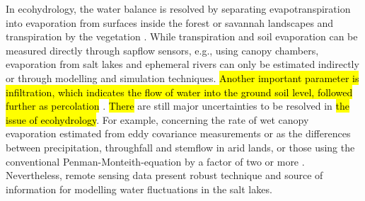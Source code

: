 \documentclass[climate,article,submit,pdftex,moreauthors]{Definitions/mdpi}
\begin{document}
{In ecohydrology, the water balance is resolved by separating evapotranspiration into evaporation from surfaces inside the forest or savannah landscapes and transpiration by the vegetation} \cite{MORGAN2020104220,ZADOROVA2025108671}. While transpiration and soil evaporation can be measured directly through sapflow sensors, e.g., using canopy chambers, evaporation from salt lakes and ephemeral rivers can only be estimated indirectly or through modelling and simulation techniques. \hl{Another important parameter is infiltration, which indicates the flow of water into the ground soil level, followed further as percolation} \cite{Khan2014}. \hl{There} are still major uncertainties to be resolved in \hl{the issue of ecohydrology}. For example, concerning the rate of wet canopy evaporation estimated from eddy covariance measurements or as the differences between precipitation, throughfall and stemflow in arid lands, or those using the conventional Penman-Monteith-equation by a factor of two or more \cite{NOURANI2025113012,AHMADI2021106622,ABDULLAH2015184}. {Nevertheless, remote sensing data present robust technique and source of information for modelling water fluctuations in the salt lakes.}
\end{document}
